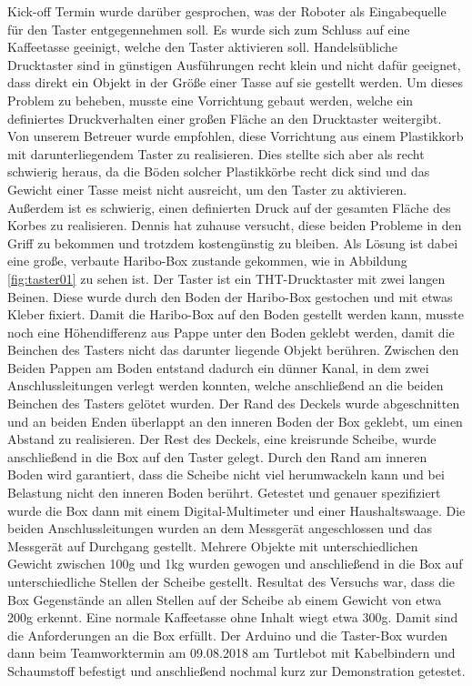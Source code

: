 \documentclass[a4paper,12pt,headsepline]{scrartcl}
\begin{document}
Kick-off Termin wurde darüber gesprochen, was der Roboter als Eingabequelle für den Taster entgegennehmen soll. Es wurde sich zum Schluss auf eine Kaffeetasse geeinigt, welche den Taster aktivieren soll. Handelsübliche Drucktaster sind in günstigen Ausführungen recht klein und nicht dafür geeignet, dass direkt ein Objekt in der Größe einer Tasse auf sie gestellt werden. Um dieses Problem zu beheben, musste eine Vorrichtung gebaut werden, welche ein definiertes Druckverhalten einer großen Fläche an den Drucktaster weitergibt. Von unserem Betreuer wurde empfohlen, diese Vorrichtung aus einem Plastikkorb mit darunterliegendem Taster zu realisieren. Dies stellte sich aber als recht schwierig heraus, da die Böden solcher Plastikkörbe recht dick sind und das Gewicht einer Tasse meist nicht ausreicht, um den Taster zu aktivieren. Außerdem ist es schwierig, einen definierten Druck auf der gesamten Fläche des Korbes zu realisieren. Dennis hat zuhause versucht, diese beiden Probleme in den Griff zu bekommen und trotzdem kostengünstig zu bleiben. Als Lösung ist dabei eine große, verbaute Haribo-Box zustande gekommen, wie in Abbildung \ref{fig:taster01} zu sehen ist. Der Taster ist ein THT-Drucktaster mit zwei langen Beinen. Diese wurde durch den Boden der Haribo-Box gestochen und mit etwas Kleber fixiert. Damit die Haribo-Box auf den Boden gestellt werden kann, musste noch eine Höhendifferenz aus Pappe unter den Boden geklebt werden, damit die Beinchen des Tasters nicht das darunter liegende Objekt berühren. Zwischen den Beiden Pappen am Boden entstand dadurch ein dünner Kanal, in dem zwei Anschlussleitungen verlegt werden konnten, welche anschließend an die beiden Beinchen des Tasters gelötet wurden. Der Rand des Deckels wurde abgeschnitten und an beiden Enden überlappt an den inneren Boden der Box geklebt, um einen Abstand zu realisieren. Der Rest des Deckels, eine kreisrunde Scheibe, wurde anschließend in die Box auf den Taster gelegt. Durch den Rand am inneren Boden wird garantiert, dass die Scheibe nicht viel herumwackeln kann und bei Belastung nicht den inneren Boden berührt. Getestet und genauer spezifiziert wurde die Box dann mit einem Digital-Multimeter und einer Haushaltswaage. Die beiden Anschlussleitungen wurden an dem Messgerät angeschlossen und das Messgerät auf Durchgang gestellt. Mehrere Objekte mit unterschiedlichen Gewicht zwischen 100g und 1kg wurden gewogen und anschließend in die Box auf unterschiedliche Stellen der Scheibe gestellt. Resultat des Versuchs war, dass die Box Gegenstände an allen Stellen auf der Scheibe ab einem Gewicht von etwa 200g erkennt. Eine normale Kaffeetasse ohne Inhalt wiegt etwa 300g. Damit sind die Anforderungen an die Box erfüllt. Der Arduino und die Taster-Box wurden dann beim Teamworktermin am 09.08.2018 am Turtlebot mit Kabelbindern und Schaumstoff befestigt und anschließend nochmal kurz zur Demonstration getestet.
\end{document}
